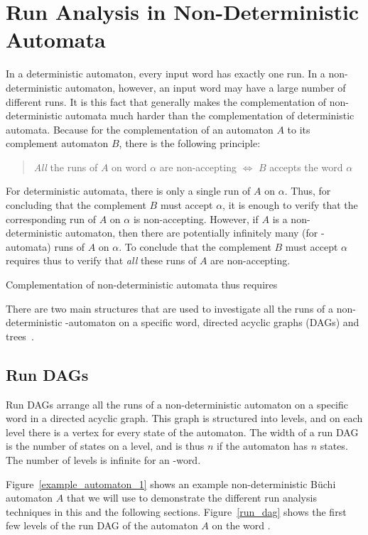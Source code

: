 \section{Run Analysis in Non-Deterministic Automata}
In a deterministic automaton, every input word has exactly one run. In a non-deterministic automaton, however, an input word may have a large number of different runs. It is this fact that generally makes the complementation of non-deterministic automata much harder than the complementation of deterministic automata. Because for the complementation of an automaton $A$ to its complement automaton $B$, there is the following principle:

\begin{quote}
\centering
\textit{All} the runs of $A$ on word $\alpha$ are non-accepting $\Longleftrightarrow$ $B$ accepts the word $\alpha$
\end{quote}

For deterministic automata, there is only a single run of $A$ on $\alpha$. Thus, for concluding that the complement $B$ must accept $\alpha$, it is enough to verify that the corresponding run of $A$ on $\alpha$ is non-accepting. However, if $A$ is a non-deterministic automaton, then there are potentially infinitely many (for \om-automata) runs of $A$ on $\alpha$. To conclude that the complement $B$ must accept $\alpha$ requires thus to verify that \textit{all} these runs of $A$ are non-accepting.

Complementation of non-deterministic automata thus requires 

There are two main structures that are used to investigate all the runs of a non-deterministic \om-automaton on a specific word, directed acyclic graphs (DAGs) and trees~\cite{2014_wilke}. 

\subsection{Run DAGs}
Run DAGs arrange all the runs of a non-deterministic automaton on a specific word in a directed acyclic graph. This graph is structured into levels, and on each level there is a vertex for every state of the automaton. The width of a run DAG is the number of states on a level, and is thus $n$ if the automaton has $n$ states. The number of levels is infinite for an \om-word.

Figure~\ref{example_automaton_1} shows an example non-deterministic Büchi automaton $A$ that we will use to demonstrate the different run analysis techniques in this and the following sections. Figure~\ref{run_dag} shows the first few levels of the run DAG of the automaton $A$ on the word \aom. 

